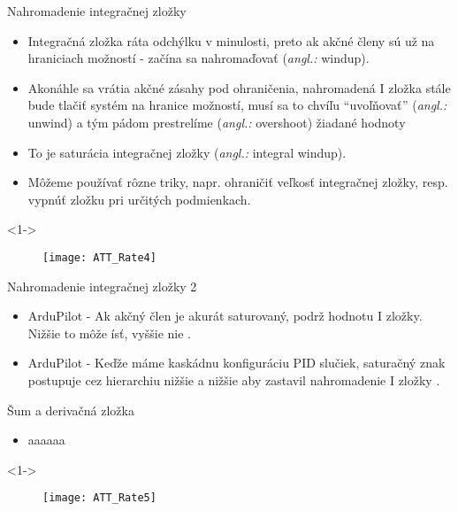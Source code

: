 \documentclass{beamer}
\newcommand{\angl}[1]{{\color{gray}(\emph{angl.:} #1)}}
\begin{document}
\begin{frame}[t]{Nahromadenie integračnej zložky}
  \begin{itemize}
    \item<1-> Integračná zložka ráta odchýlku v minulosti, preto ak akčné členy sú už na hraniciach možností - začína sa nahromaďovať \angl{windup}.
    \item<2-> Akonáhle sa vrátia akčné zásahy pod ohraničenia, nahromadená I zložka stále bude tlačiť systém na hranice možností, musí sa to chvíľu ``uvoľňovať'' \angl{unwind} a tým pádom prestrelíme \angl{overshoot} žiadané hodnoty
    \item<3-> To je saturácia integračnej zložky \angl{integral windup}.
    \item<4-> Môžeme používať rôzne triky, napr. ohraničiť veľkosť integračnej zložky, resp. vypnúť zložku pri určitých podmienkach.
  \end{itemize}
      \begin{onlyenv}<1->
  \begin{figure}
\centering
  \texttt{[image: ATT\_Rate4]}\\
\end{figure}
\end{onlyenv}

\end{frame}

\begin{frame}[t]{Nahromadenie integračnej zložky 2}
  \begin{itemize}
  \item<1-> ArduPilot - Ak akčný člen je akurát saturovaný, podrž hodnotu I zložky. Nižšie to môže ísť, vyššie nie \citep{AP:PID}.
  \item<2-> ArduPilot - Keďže máme kaskádnu konfiguráciu PID slučiek, saturačný znak postupuje cez hierarchiu nižšie a nižšie aby zastavil nahromadenie I zložky \citep{AP:PID}.
  \end{itemize}
\end{frame}

\begin{frame}[t]{Šum a derivačná zložka}
  \begin{itemize}
    \item<1-> aaaaaa
  \end{itemize}
      \begin{onlyenv}<1->
  \begin{figure}
\centering
  \texttt{[image: ATT\_Rate5]}\\
\end{figure}
\end{onlyenv}

\end{frame}
\end{document}

